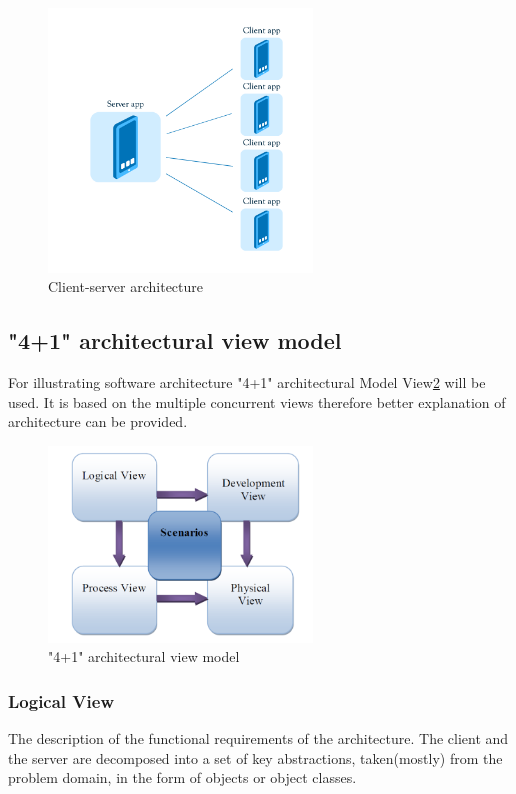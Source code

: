 \begin{figure}[H]
	\centering
		\includegraphics[width=7cm]{sprint1/arhitecture.png}
	\caption{Client-server architecture}
	\label{fig:sprint1_arhitecture}
\end{figure}

\subsection{"4+1" architectural view model}
For illustrating software architecture "4+1" architectural Model View\ref{fig:4+1 } will be used. It is based on the multiple concurrent views therefore better explanation of architecture can be provided.

\begin{figure}[H]
	\centering
		\includegraphics[width=7cm]{sprint1/4+1.png}
	\caption{"4+1" architectural view model}
	\label{fig:4+1 }

\end{figure}

\subsubsection{Logical View}
The description of the functional requirements of the architecture. The client and the server are decomposed into a set of key abstractions, taken(mostly) from the problem domain, in the form of objects or object classes.

